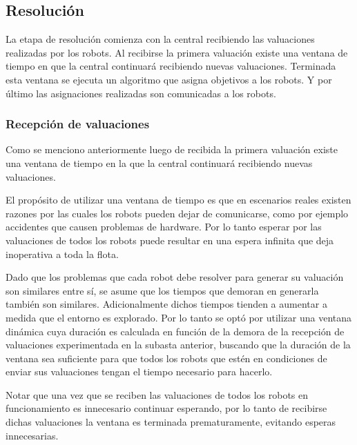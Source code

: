 \subsection{Resolución} \label{subsec:MiResSub}
La etapa de resolución comienza con la central recibiendo las valuaciones
realizadas por los robots. Al recibirse la primera valuación existe una ventana
de tiempo en que la central continuará recibiendo nuevas valuaciones.
Terminada esta ventana se ejecuta un algoritmo que asigna objetivos a los
robots. Y por último las asignaciones realizadas son comunicadas a los robots.

\subsubsection{Recepción de valuaciones}
Como se menciono anteriormente luego de recibida la primera valuación existe
una ventana de tiempo en la que la central continuará recibiendo nuevas
valuaciones.%

El propósito de utilizar una ventana de tiempo es que en escenarios reales
existen razones por las cuales los robots pueden dejar de comunicarse, como por
ejemplo accidentes que causen problemas de hardware. Por lo tanto esperar
por las valuaciones de todos los robots puede resultar en una espera infinita que
deja inoperativa a toda la flota.


Dado que los problemas que cada robot debe resolver para generar su valuación
son similares entre sí, se asume que los tiempos que demoran en generarla también
son similares. Adicionalmente dichos tiempos tienden a aumentar a medida que el
entorno es explorado. Por lo tanto se optó por utilizar una ventana dinámica
cuya duración es calculada en función de la demora de la recepción de
valuaciones experimentada en la subasta anterior, buscando que la duración de la ventana sea suficiente para que todos
los robots que estén en condiciones de enviar sus valuaciones tengan el
tiempo necesario para hacerlo.

Notar que una vez que se reciben las valuaciones de todos los robots
en funcionamiento es innecesario continuar esperando, por lo tanto de recibirse
dichas valuaciones la ventana es terminada prematuramente, evitando esperas
innecesarias.

